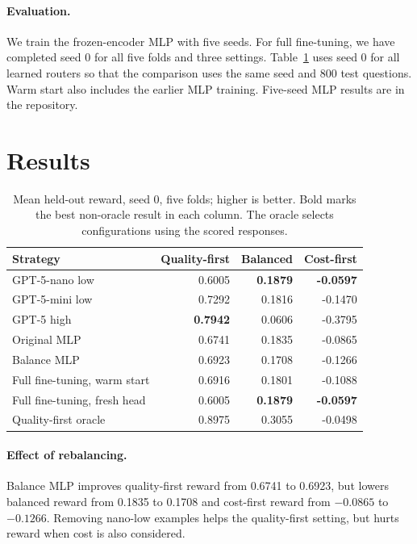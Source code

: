 \documentclass{article}
\begin{document}
\paragraph{Evaluation.} We train the frozen-encoder MLP with five seeds. For full fine-tuning, we have completed seed 0 for all five folds and three settings. Table~\ref{tab:reward} uses seed 0 for all learned routers so that the comparison uses the same seed and 800 test questions. Warm start also includes the earlier MLP training. Five-seed MLP results are in the repository.

\section{Results}
\begin{table}[t]
\centering\small
\caption{Mean held-out reward, seed 0, five folds; higher is better. Bold marks the best non-oracle result in each column. The oracle selects configurations using the scored responses.}\label{tab:reward}
\begin{tabular}{lrrr}
\toprule
Strategy & Quality-first & Balanced & Cost-first\\
\midrule
GPT-5-nano low & 0.6005 & \textbf{0.1879} & \textbf{-0.0597}\\
GPT-5-mini low & 0.7292 & 0.1816 & -0.1470\\
GPT-5 high & \textbf{0.7942} & 0.0606 & -0.3795\\
Original MLP & 0.6741 & 0.1835 & -0.0865\\
Balance MLP & 0.6923 & 0.1708 & -0.1266\\
Full fine-tuning, warm start & 0.6916 & 0.1801 & -0.1088\\
Full fine-tuning, fresh head & 0.6005 & \textbf{0.1879} & \textbf{-0.0597}\\
\midrule
Quality-first oracle & 0.8975 & 0.3055 & -0.0498\\
\bottomrule
\end{tabular}
\end{table}

\paragraph{Effect of rebalancing.} Balance MLP improves quality-first reward from 0.6741 to 0.6923, but lowers balanced reward from 0.1835 to 0.1708 and cost-first reward from $-0.0865$ to $-0.1266$. Removing nano-low examples helps the quality-first setting, but hurts reward when cost is also considered.
\end{document}
